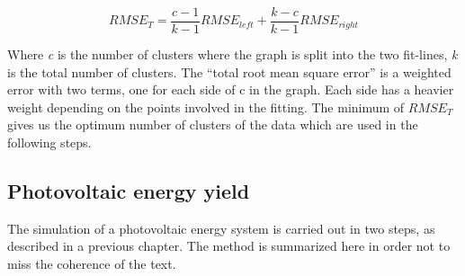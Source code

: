 \begin{itemize}
\begin{equation}\label{eq:total_RMSE}
  RMSE_T = \frac{c-1}{k-1}RMSE_{left}+\frac{k-c}{k-1}RMSE_{right}
\end{equation}



Where \textit{c} is the number of clusters where the graph is split into the two fit-lines, \textit{k} is the total number of clusters. The ``total root mean square error'' is a weighted error with two terms, one for each side of c in the graph. Each side has a heavier weight depending on the points involved in the fitting. The minimum of $RMSE_{T}$ gives us the optimum number of clusters of the data \cite*{Zagouras2013} which are used in the following steps.
 
\end{itemize}
 
\subsection{Photovoltaic energy yield}

The simulation of a photovoltaic energy system is carried out in two steps, as described in a previous chapter. The method is summarized here in order not to miss the coherence of the text.


